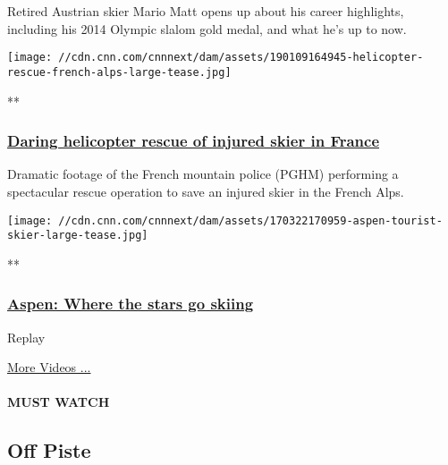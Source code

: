 Retired Austrian skier Mario Matt opens up about his career highlights,
including his 2014 Olympic slalom gold medal, and what he's up to now.

\href{/videos/sports/2019/01/09/helicopter-rescue-france-ski-french-alps-hiking-spt-intl.cnn}{}

\texttt{[image: //cdn.cnn.com/cnnnext/dam/assets/190109164945-helicopter-rescue-french-alps-large-tease.jpg]}

**

\hypertarget{daring-helicopter-rescue-of-injured-skier-in-france}{%
\subsubsection{\texorpdfstring{\href{/videos/sports/2019/01/09/helicopter-rescue-france-ski-french-alps-hiking-spt-intl.cnn}{Daring
helicopter rescue of injured skier in
France}}{Daring helicopter rescue of injured skier in France}}\label{daring-helicopter-rescue-of-injured-skier-in-france}}

Dramatic footage of the French mountain police (PGHM) performing a
spectacular rescue operation to save an injured skier in the French
Alps.

\href{/videos/sports/2015/11/28/aspen-colorado-ski-town-history-macfarlane-pkg.cnn}{}

\texttt{[image: //cdn.cnn.com/cnnnext/dam/assets/170322170959-aspen-tourist-skier-large-tease.jpg]}

**

\hypertarget{aspen-where-the-stars-go-skiing}{%
\subsubsection{\texorpdfstring{\href{/videos/sports/2015/11/28/aspen-colorado-ski-town-history-macfarlane-pkg.cnn}{Aspen:
Where the stars go
skiing}}{Aspen: Where the stars go skiing}}\label{aspen-where-the-stars-go-skiing}}

\href{javascript:void(0);}{}

Replay

\href{/videos}{More Videos ...}

\hypertarget{must-watch}{%
\paragraph{MUST WATCH}\label{must-watch}}

\hypertarget{off-piste-}{%
\subsection{Off Piste~}\label{off-piste-}}

